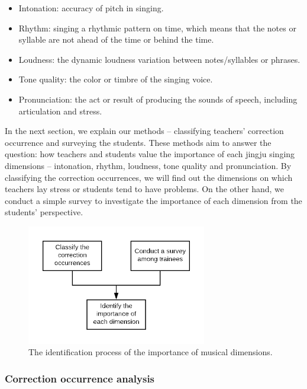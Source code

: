 \begin{itemize}[itemsep=0pt]
	\item Intonation: accuracy of pitch in singing.
	\item Rhythm: singing a rhythmic pattern on time, which means that the notes or syllable are not ahead of the time or behind the time.
	\item Loudness: the dynamic loudness variation between notes/syllables or phrases.
	\item Tone quality: the color or timbre of the singing voice.
	\item Pronunciation: the act or result of producing the sounds of speech, including articulation and stress.
\end{itemize}

In the next section, we explain our methods -- classifying teachers' correction occurrence and surveying the students. These methods aim to answer the question: how teachers and students value the importance of each jingju singing dimensions -- intonation, rhythm, loudness, tone quality and pronunciation. By classifying the correction occurrences, we will find out the dimensions on which teachers lay stress or students tend to have problems. On the other hand, we conduct a simple survey to investigate the importance of each dimension from the students' perspective.

\begin{figure}[ht!]
\centering
\includegraphics[width=0.7\textwidth]{figs/blockDiags_rong/ch3_occurrance_analysis_flow.png}
\caption{The identification process of the importance of musical dimensions.}
\label{fig:ch3_occurrance_analysis_flow}
\end{figure}

\subsubsection{Correction occurrence analysis}\label{sec:ch3:correction_analysis}

